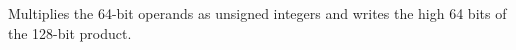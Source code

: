 Multiplies the 64-bit operands as unsigned integers and writes the high 64 bits of the 128-bit product.
